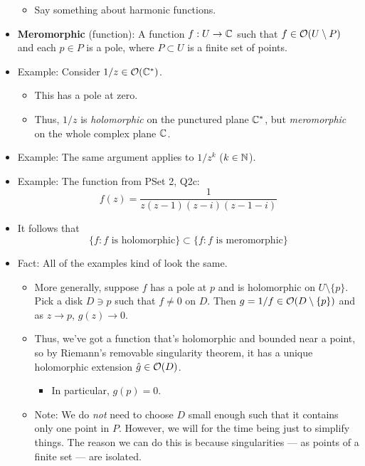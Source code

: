 \documentclass[../notes.tex]{subfiles}
\begin{document}
\begin{itemize}
\begin{itemize}
        \item Say something about harmonic functions.
    \end{itemize}
    \item \textbf{Meromorphic} (function): A function $f:U\to\mathbb{C}$ such that $f\in\mathcal{O}(U\setminus P)$ and each $p\in P$ is a pole, where $P\subset U$ is a finite set of points.
    \item Example: Consider $1/z\in\mathcal{O}(\mathbb{C}^*)$.
    \begin{itemize}
        \item This has a pole at zero.
        \item Thus, $1/z$ is \emph{holomorphic} on the punctured plane $\mathbb{C}^*$, but \emph{meromorphic} on the whole complex plane $\mathbb{C}$.
    \end{itemize}
    \item Example: The same argument applies to $1/z^k$ ($k\in\mathbb{N}$).
    \item Example: The function from PSet 2, Q2c:
    \begin{equation*}
        f(z) = \frac{1}{z(z-1)(z-i)(z-1-i)}
    \end{equation*}
    \item It follows that
    \begin{equation*}
        \{f:f\text{ is holomorphic}\} \subset \{f:f\text{ is meromorphic}\}
    \end{equation*}
    \item Fact: All of the examples kind of look the same.
    \begin{itemize}
        \item More generally, suppose $f$ has a pole at $p$ and is holomorphic on $U\setminus\{p\}$. Pick a disk $D\ni p$ such that $f\neq 0$ on $D$. Then $g=1/f\in\mathcal{O}(D\setminus\{p\})$ and as $z\to p$, $g(z)\to 0$.
        \item Thus, we've got a function that's holomorphic and bounded near a point, so by Riemann's removable singularity theorem, it has a unique holomorphic extension $\hat{g}\in\mathcal{O}(D)$.
        \begin{itemize}
            \item In particular, $g(p)=0$.
        \end{itemize}
        \item Note: We do \emph{not} need to choose $D$ small enough such that it contains only one point in $P$. However, we will for the time being just to simplify things. The reason we can do this is because singularities --- as points of a finite set --- are isolated.

\end{itemize}
\end{itemize}
\end{document}
